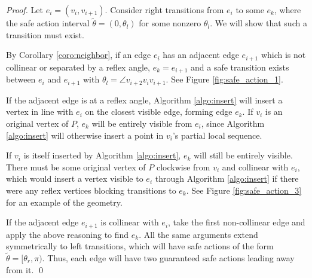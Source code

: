 \documentclass[]{styles/svproc}  %
\begin{document}
\begin{proof}

Let $e_i = (v_i, v_{i+1})$. Consider right transitions from $e_i$ to some $e_k$,
where the safe action interval $\tilde{\theta} = (0, \theta_l)$ for some 
nonzero $\theta_l$. We will show that such a transition must exist. 

By Corollary \ref{coro:neighbor}, if an edge $e_i$ has an adjacent edge
$e_{i+1}$ which is not collinear or separated by a reflex angle, 
$e_k = e_{i+1}$ and a safe transition exists
between $e_i$ and $e_{i+1}$ with $\theta_l = \angle v_{i+2} v_i v_{i+1}$. 
See Figure \ref{fig:safe_action_1}.

If the adjacent edge is at a reflex angle, Algorithm 
\ref{algo:insert} will insert a vertex in line with $e_i$ on the closest visible
edge, forming edge $e_k$. If $v_i$ is an original
vertex of $P$, $e_k$ will be entirely visible from $e_i$, since Algorithm
\ref{algo:insert} will otherwise insert a point in $v_i$'s partial local
sequence.

If $v_i$ is itself inserted by Algorithm \ref{algo:insert}, $e_k$ will still be
entirely visible. There must be some original vertex of $P$
clockwise from $v_i$ and collinear with $e_i$, which would insert a vertex
visible to $e_i$ through Algorithm \ref{algo:insert} if there were any reflex vertices
blocking transitions to $e_k$.
See Figure \ref{fig:safe_action_3} for an example of the geometry.

If the adjacent edge $e_{i+1}$ is collinear with $e_i$, take the first
non-collinear edge and apply the above reasoning to find $e_k$.
All the same arguments extend symmetrically to left transitions, which will have
safe actions of the form $\tilde{\theta} = [\theta_r, \pi)$. Thus, each edge will 
have two guaranteed safe actions leading away from it. \qed
\end{proof}
\end{document}
